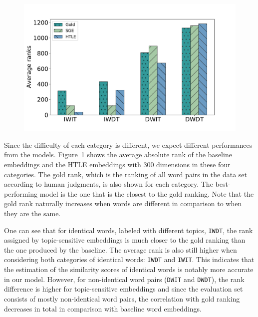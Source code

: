    \begin{figure}[htb!]
\centering
\includegraphics[scale=0.4]{03-research-01/figs/iwits2.pdf} 
  \label{scwsbar}
   \end{figure}
   
Since the difficulty of each category is different, we expect different performances from the models.
Figure~\ref{scwsbar} shows the average absolute rank of the baseline embeddings and the HTLE embeddings with 300 dimensions in these four categories. 
The gold rank, which is the ranking of all word pairs in the data set according to human judgments, is also shown for each category.
The best-performing model is the one that is the closest to the gold ranking.
Note that the gold rank naturally increases when words are different in comparison to when they are the same. 
   
One can see that for identical words, labeled with different topics, \texttt{IWDT}, the rank assigned by topic-sensitive embeddings is much closer to the gold ranking than the one produced by the baseline. 
The average rank is also still higher when considering both categories of identical words: \texttt{IWDT} and \texttt{IWIT}.
This indicates that the estimation of the similarity scores of identical words is notably more accurate in our model. 
%
However, for non-identical word pairs (\texttt{DWIT} and \texttt{DWDT}), the rank difference is higher for topic-sensitive embeddings and since the evaluation set consists of mostly non-identical word pairs, the correlation with gold ranking decreases in total in comparison with baseline word embeddings. 

